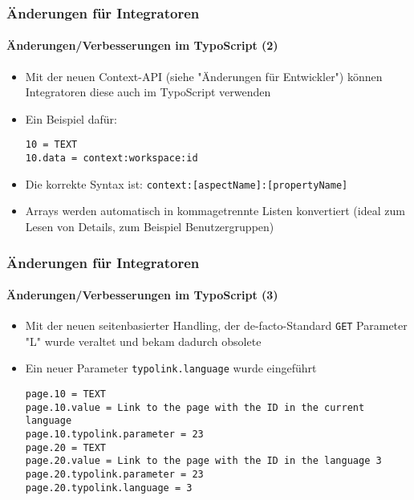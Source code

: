\begin{frame}[fragile]
	\frametitle{Änderungen für Integratoren}
	\framesubtitle{Änderungen/Verbesserungen im TypoScript (2)}

	\lstset{basicstyle=\smaller\ttfamily}

	\begin{itemize}
		\item Mit der neuen Context-API (siehe "Änderungen für Entwickler") können Integratoren
			diese auch im TypoScript verwenden

		\item Ein Beispiel dafür:

			\begin{lstlisting}
10 = TEXT
10.data = context:workspace:id
			\end{lstlisting}

		\item Die korrekte Syntax ist: \texttt{context:[aspectName]:[propertyName]}

		\item Arrays werden automatisch in kommagetrennte Listen konvertiert\newline
			\smaller(ideal zum Lesen von Details, zum Beispiel Benutzergruppen)\normalsize

	\end{itemize}

\end{frame}


\begin{frame}[fragile]
	\frametitle{Änderungen für Integratoren}
	\framesubtitle{Änderungen/Verbesserungen im TypoScript (3)}

	\lstset{basicstyle=\smaller\ttfamily}

	\begin{itemize}
		\item Mit der neuen seitenbasierter Handling, der de-facto-Standard \texttt{GET}
			Parameter "L" wurde veraltet und bekam dadurch obsolete
		\item Ein neuer Parameter \texttt{typolink.language} wurde eingeführt

			\begin{lstlisting}
page.10 = TEXT
page.10.value = Link to the page with the ID in the current language
page.10.typolink.parameter = 23
page.20 = TEXT
page.20.value = Link to the page with the ID in the language 3
page.20.typolink.parameter = 23
page.20.typolink.language = 3
			\end{lstlisting}

	\end{itemize}

\end{frame}

